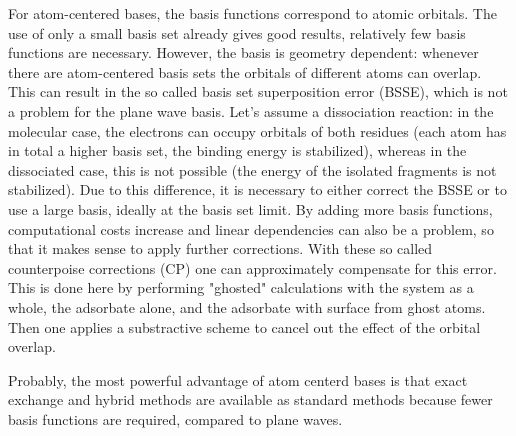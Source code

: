 \documentclass[11pt,DIV=13,BCOR=5mm,a4paper,headinclude]{scrbook}
\begin{document}
For atom-centered bases, the basis functions correspond to atomic orbitals.
The use of only a small basis set already gives good results, relatively few basis functions are necessary.
However, the basis is geometry dependent: whenever there are atom-centered basis sets the orbitals of different atoms can overlap.
This can result in the so called basis set superposition error (BSSE)\cite{BSSE1970}, which is not a problem for the plane wave basis.
Let's assume a dissociation reaction: in the molecular case, the electrons can occupy orbitals of both residues (each atom has in total a higher basis set, the binding energy is stabilized), whereas in the dissociated case, this is not possible (the energy of the isolated fragments is not stabilized).
Due to this difference, it is necessary to either correct the BSSE or to use a large basis, ideally at the basis set limit.
By adding more basis functions, computational costs increase and linear dependencies can also be a problem, so that it makes sense to apply further corrections.
With these so called counterpoise corrections (CP)\cite{Boys1970} one can approximately compensate for this error.
This is done here by performing "ghosted" calculations with the system as a whole, the adsorbate alone, and the adsorbate with surface from ghost atoms.
Then one applies a substractive scheme to cancel out the effect of the orbital overlap.

Probably, the most powerful advantage of atom centerd bases is that exact exchange and hybrid methods are available as standard methods because fewer basis functions are required, compared to plane waves.
\end{document}

